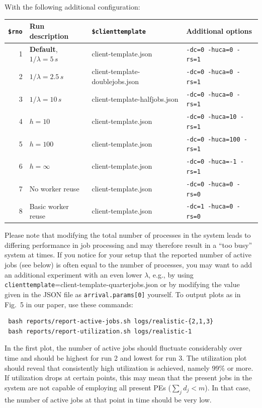 \documentclass[runningheads]{article}
\numberwithin{dummy}{subsection}
\begin{document}
With the following additional configuration:\\

{
\begin{tabular}{|r|l|l|l|}
\hline
\texttt{\$rno} & Run description & \texttt{\$clienttemplate} & Additional options \\
\hline
1 & \textbf{Default}, $1/\lambda=5\,s$ & client-template.json & \texttt{-dc=0 -huca=0 -rs=1} \\
2 & $1/\lambda=2.5\,s$ & client-template-doublejobs.json & \texttt{-dc=0 -huca=0 -rs=1} \\
3 & $1/\lambda=10\,s$ & client-template-halfjobs.json & \texttt{-dc=0 -huca=0 -rs=1} \\
\hline
4 & $h=10$ & client-template.json & \texttt{-dc=0 -huca=10 -rs=1} \\
5 & $h=100$ & client-template.json & \texttt{-dc=0 -huca=100 -rs=1} \\
6 & $h=\infty$ & client-template.json & \texttt{-dc=0 -huca=-1 -rs=1} \\
\hline
7 & No worker reuse & client-template.json & \texttt{-dc=0 -huca=0 -rs=0} \\
8 & Basic worker reuse & client-template.json & \texttt{-dc=1 -huca=0 -rs=0} \\
\hline
\end{tabular}
}
\vspace{0.4cm}

Please note that modifying the total number of processes in the system leads to differing performance in job processing and may therefore result in a ``too busy'' system at times.
If you notice for your setup that the reported number of active jobs (see below) is often equal to the number of processes, you may want to add an additional experiment with an even lower $\lambda$, e.g., by using \texttt{clienttemplate}=client-template-quarterjobs.json or by modifying the value given in the JSON file as \texttt{arrival.params[0]} yourself.
To output plots as in Fig.~5 in our paper, use these commands:
\begin{verbatim}
 bash reports/report-active-jobs.sh logs/realistic-{2,1,3}
 bash reports/report-utilization.sh logs/realistic-1
\end{verbatim}
In the first plot, the number of active jobs should fluctuate considerably over time and should be highest for run 2 and lowest for run 3.
The utilization plot should reveal that consistently high utilization is achieved, namely 99\% or more.
If utilization drops at certain points, this may mean that the present jobs in the system are not capable of employing all present PEs ($\sum_j d_j < m$).
In that case, the number of active jobs at that point in time should be very low.
\end{document}
